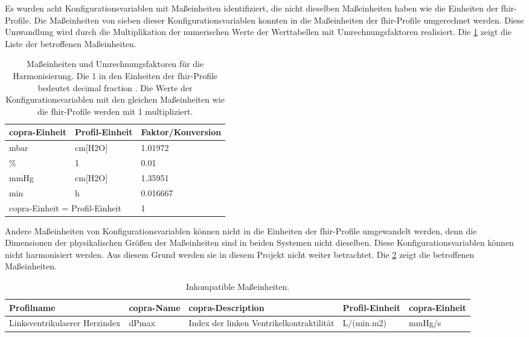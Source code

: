 Es wurden acht Konfigurationsvariablen mit Maßeinheiten identifiziert, die nicht dieselben Maßeinheiten haben wie die Einheiten der \ac{fhir}-Profile. Die Maßeinheiten von sieben dieser Konfigurationsvariablen konnten in die Maßeinheiten der \ac{fhir}-Profile umgerechnet werden. Diese Umwandlung wird durch die Multiplikation der numerischen Werte der Werttabellen mit Umrechnungsfaktoren realisiert. Die \ref{tab:unittoconvert} zeigt die Liste der betroffenen Maßeinheiten.  

\clearpage

\begin{table}[ht]
	\centering
	\caption[Maßeinheiten und Umrechnungsfaktoren für die Harmonisierung]{Maßeinheiten und Umrechnungsfaktoren für die Harmonisierung. Die 1 in den Einheiten der \ac{fhir}-Profile bedeutet \glqq decimal fraction\grqq{} \cite{unitsloinc}. Die Werte der Konfigurationsvariablen mit den gleichen Maßeinheiten wie die \ac{fhir}-Profile werden mit 1 multipliziert.}
	\label{tab:unittoconvert}
	\begin{tabular}{|l|l|l|} \hline
		\bfseries \ac{copra}-Einheit & \bfseries Profil-Einheit & \bfseries Faktor/Konversion \\ \hline
		mbar & cm[H2O] & 1.01972 \\ \hline
		\% & 1 & 0.01 \\ \hline
		mmHg & cm[H2O] & 1.35951 \\ \hline
		min & h & 0.016667 \\ \hline
		\multicolumn{2}{|l|}{\ac{copra}-Einheit = Profil-Einheit} & 1 \\ \hline
	\end{tabular}
\end{table}

Andere Maßeinheiten von Konfigurationsvariablen können nicht in die Einheiten der \ac{fhir}-Profile umgewandelt werden, denn die Dimensionen der physikalischen Größen der Maßeinheiten sind in beiden Systemen nicht dieselben. Diese Konfigurationsvariablen können nicht harmonisiert werden. Aus diesem Grund werden sie in diesem Projekt nicht weiter betrachtet. Die \ref{tab:unitnocompat} zeigt die betroffenen Maßeinheiten. 

\begin{table}[ht]
	\centering
	\caption[Inkompatible Maßeinheiten]{Inkompatible Maßeinheiten.}
	\label{tab:unitnocompat}
	\begin{tabular}{|p{3.3cm}|p{1.7cm}|p{2.6cm}|p{2cm}|p{1.8cm}|} \hline
		\bfseries Profilname & \bfseries \ac{copra}-Name & \bfseries \ac{copra}-Description & \bfseries Profil-Einheit & \bfseries \ac{copra}-Einheit \\ \hline
		Linksventrikulaerer Herzindex & dPmax & Index der linken Ventrikelkontraktilität & L/(min.m2) & mmHg/s \\ \hline
	\end{tabular}
\end{table}

